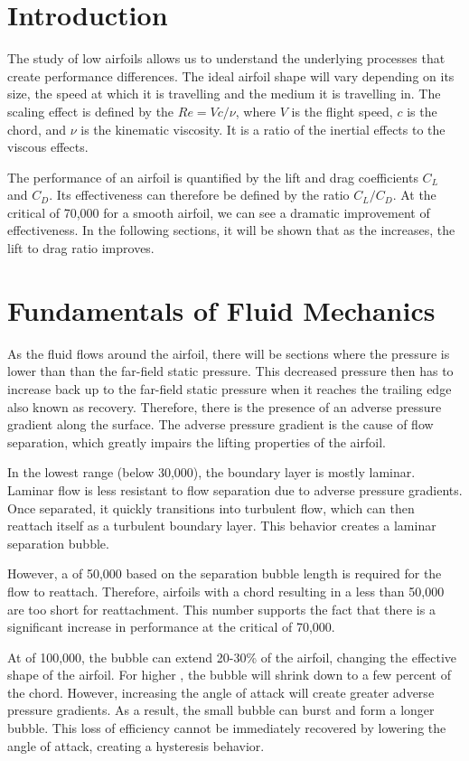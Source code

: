 \documentclass[letterpaper,12pt,]{article}
\begin{document}
\section{Introduction}

The study of low \rn airfoils allows us to understand the underlying processes that create performance differences. The ideal airfoil shape will vary depending on its size, the speed at which it is travelling and the medium it is travelling in. The scaling effect is defined by the \rn $Re = Vc/\nu$, where $V$ is the flight speed, $c$ is the chord, and $\nu$ is the kinematic viscosity. It is a ratio of the inertial effects to the viscous effects.

The performance of an airfoil is quantified by the lift and drag coefficients $C_L$ and $C_D$. Its effectiveness can therefore be defined by the ratio $C_L/C_D$. At the critical \rn of 70,000 for a smooth airfoil, we can see a dramatic improvement of effectiveness. In the following sections, it will be shown that as the \rn increases, the lift to drag ratio improves. 
\section{Fundamentals of Fluid Mechanics}

As the fluid flows around the airfoil, there will be sections where the pressure is lower than than the far-field static pressure. This decreased pressure then has to increase back up to the far-field static pressure when it reaches the trailing edge also known as recovery. Therefore, there is the presence of an adverse pressure gradient along the surface. The adverse pressure gradient is the cause of flow separation, which greatly impairs the lifting properties of the airfoil.

In the lowest \rn range (below 30,000), the boundary layer is mostly laminar. Laminar flow is less resistant to flow separation due to adverse pressure gradients. Once separated, it quickly transitions into turbulent flow, which can then reattach itself as a turbulent boundary layer. This behavior creates a laminar separation bubble.

However, a \rn of 50,000 based on the separation bubble length is required for the flow to reattach. Therefore, airfoils with a chord resulting in a \rn less than 50,000 are too short for reattachment. This number supports the fact that there is a significant increase in performance at the critical \rn of 70,000.

At \rn of 100,000, the bubble can extend 20-30\% of the airfoil, changing the effective shape of the airfoil. For higher \rn, the bubble will shrink down to a few percent of the chord. However, increasing the angle of attack will create greater adverse pressure gradients. As a result, the small bubble can burst and form a longer bubble. This loss of efficiency cannot be immediately recovered by lowering the angle of attack, creating a hysteresis behavior.
\end{document}
